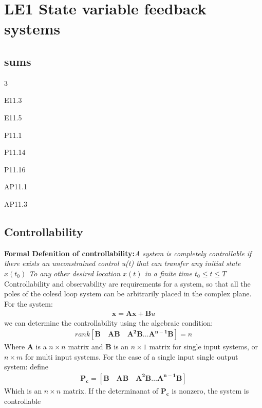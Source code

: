 \documentclass{report}
\begin{document}
\chapter{LE1 State variable feedback systems}
	\section{sums}
\begin{itemize}
	
\end{itemize}
	
	\section{Controllability}
	\label{sub:controllability}
{\bf Formal Defenition of controllability:}\emph{A system is completely controllable if there exists an unconstrained control u(t) that can transfer any initial state $x(t_0)$ To any other desired location $x(t)$ in a finite time $t_0 \leq t \leq T$}\\
Controllability and observability are requirements for a system, so that all the poles of the colesd loop system can be arbitrarily placed in the complex plane.\\
For the system:
\begin{align*}
\dot{\mathbf{x}} = \mathbf{Ax+B}u	
\end{align*}
we can determine the controllability using the algebraic condition:
\begin{align*}
rank[\mathbf{B \quad AB \quad A^2B \ldots A^{n-1}B }] = n	
\end{align*}
Where $\mathbf{A}$ is a $n \times n$ matrix and $\mathbf{B}$ is an $n \times 1$ matrix for single input systems, or $n \times m$ for multi input systems.
For the case of a single input single output system: define
\begin{align*}
\mathbf{P_c = [\mathbf{B \quad AB \quad A^2B \ldots A^{n-1}B }]}	
\end{align*}
Which is an $n \times n$ matrix. If the determinanat of $\mathbf{P_c}$ is nonzero, the system is controllable\\
\end{document}
